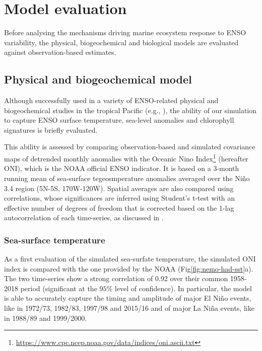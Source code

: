 \section{Model evaluation}

Before analysing the mechanisms driving marine ecosystem response to ENSO variability, the physical, biogeochemical and biological models are evaluated against observation-based estimates.

\subsection{Physical and biogeochemical model}

Although successfully used in a variety of ENSO-related physical and biogeochemical studies in the tropical Pacific (e.g., \citealt{vialardModelStudyOceanic2001, lengaigneOceanResponseMarch2002, lengaigneInfluenceOceanicBiology2007, schneiderClimateinducedInterannualVariability2008, masottiLargescaleShiftsPhytoplankton2011, currieIndianOceanDipole2013}), the ability of our simulation to capture ENSO surface temperature, sea-level anomalies and chlorophyll signatures is briefly evaluated. 

This ability is assessed by comparing observation-based and simulated covariance maps of detrended monthly anomalies with the Oceanic Nino Index\footnote{\url{https://www.cpc.ncep.noaa.gov/data/indices/oni.ascii.txt}} (hereafter ONI), which is the NOAA official ENSO indicator. It is based on a 3-month running mean of sea-surface tegeosmperature anomalies averaged over the Niño 3.4 region (5N-5S, 170W-120W). Spatial averages are also compared using correlations, whose significances are inferred using Student's t-test with an effective number of degrees of freedom that is corrected based on the 1-lag autocorrelation of each time-series, as discussed in \cite{brethertonEffectiveNumberSpatial1999}.

\subsubsection{Sea-surface temperature}
\label{sec:sst}

As a first evaluation of the simulated sea-surfate temperature, the simulated ONI index is compared with the one provided by the NOAA (Fig\ref{fig:nemo-had-sst}a). The two time-series show a strong correlation of 0.92 over their common 1958-2018 period (significant at the $95\%$ level of confidence). In particular, the model is able to accurately capture the timing and amplitude of major El Niño events, like in 1972/73, 1982/83, 1997/98 and 2015/16 and of major La Niña events, like in 1988/89 and 1999/2000. 

